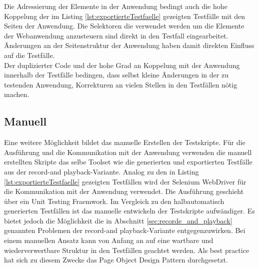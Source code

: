 Die Adressierung der Elemente in der Anwendung bedingt auch die hohe Koppelung der im Listing \ref{lst:exportierteTestfaelle} gezeigten Testfälle mit den Seiten der Anwendung. Die Selektoren die verwendet werden um die Elemente der Webanwendung anzusteuern sind direkt in den Testfall eingearbeitet. Änderungen an der Seitenstruktur der Anwendung haben damit direkten Einfluss auf die Testfälle.\\
Der duplizierter Code und der hohe Grad an Koppelung mit der Anwendung innerhalb der Testfälle bedingen, dass selbst kleine Änderungen in der zu testenden Anwendung, Korrekturen an vielen Stellen in den Testfällen nötig machen.

\subsection{Manuell}
\label{sec:manuell}
Eine weitere Möglichkeit bildet das manuelle Erstellen der Testskripte. Für die Ausführung und die Kommunikation mit der Anwendung verwenden die manuell erstellten Skripte das selbe Toolset wie die generierten und exportierten Testfälle aus der \grq record-and playback\grq -Variante. Analog zu den in Listing \ref{lst:exportierteTestfaelle} gezeigten Testfällen wird der Selenium WebDriver für die Kommunikation mit der Anwendung verwendet. Die Ausführung geschieht über ein Unit Testing Fraemwork.
Im Vergleich zu den halbautomatisch generierten Testfällen ist das manuelle entwickeln der Testskripte aufwändiger.
Es bietet jedoch die Möglichkeit die in Abschnitt \ref{sec:recorde_and_playback} genannten Problemen der \grq record-and playback\grq -Variante entgegenzuwirken.
Bei einem manuellen Ansatz kann von Anfang an auf eine wartbare und wiederverwertbare Struktur in den Testfällen geachtet werden.
Als best practice hat sich zu diesem Zwecke das Page Object Design Pattern durchgesetzt.


